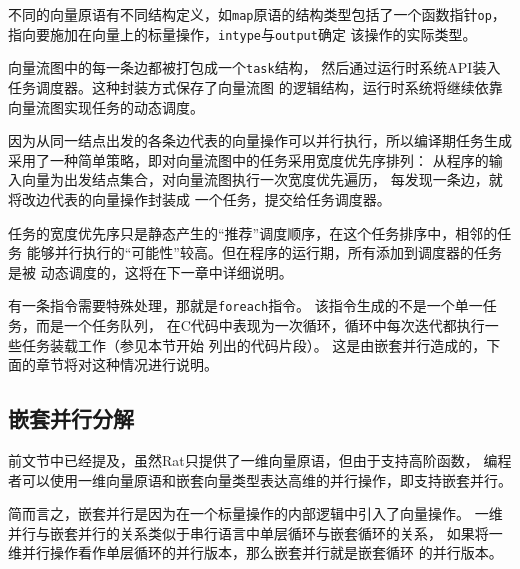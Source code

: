 不同的向量原语有不同结构定义，如\texttt{map}原语的结构类型包括了一个函数指针\texttt{op}，
指向要施加在向量上的标量操作，\texttt{intype}与\texttt{output}确定
该操作的实际类型。


向量流图中的每一条边都被打包成一个\texttt{task}结构，
然后通过运行时系统API装入任务调度器。这种封装方式保存了向量流图
的逻辑结构，运行时系统将继续依靠向量流图实现任务的动态调度。

因为从同一结点出发的各条边代表的向量操作可以并行执行，所以编译期任务生成
采用了一种简单策略，即对向量流图中的任务采用宽度优先序排列：
从程序的输入向量为出发结点集合，对向量流图执行一次宽度优先遍历，
每发现一条边，就将改边代表的向量操作封装成
一个任务，提交给任务调度器。

任务的宽度优先序只是静态产生的“推荐”调度顺序，在这个任务排序中，相邻的任务
能够并行执行的“可能性”较高。但在程序的运行期，所有添加到调度器的任务是被
动态调度的，这将在下一章中详细说明。

有一条指令需要特殊处理，那就是\texttt{foreach}指令。
该指令生成的不是一个单一任务，而是一个任务队列，
在C代码中表现为一次循环，循环中每次迭代都执行一些任务装载工作（参见本节开始
列出的代码片段）。
这是由嵌套并行造成的，下面的章节将对这种情况进行说明。

\subsection{嵌套并行分解}\label{subsec:np-decomposition}
前文节中已经提及，虽然Rat只提供了一维向量原语，但由于支持高阶函数，
编程者可以使用一维向量原语和嵌套向量类型表达高维的并行操作，即支持嵌套并行。

简而言之，嵌套并行是因为在一个标量操作的内部逻辑中引入了向量操作。
一维并行与嵌套并行的关系类似于串行语言中单层循环与嵌套循环的关系，
如果将一维并行操作看作单层循环的并行版本，那么嵌套并行就是嵌套循环
的并行版本。
\begin{quotation}
\end{quotation}

